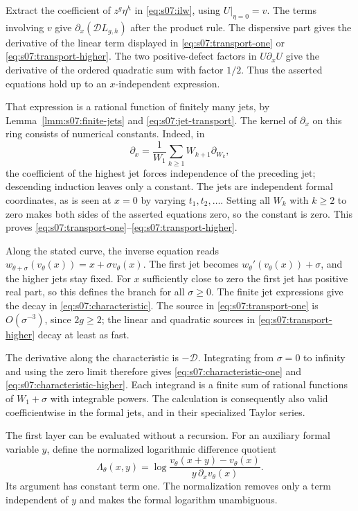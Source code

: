 \begin{prf}
Extract the coefficient of $z^g\eta^h$ in
\eqref{eq:s07:ilw}, using $U|_{\eta=0}=v$. The terms involving
$v$ give $\partial_x(\mathscr DL_{g,h})$ after the product rule.
The dispersive part gives the derivative of the linear term displayed
in \eqref{eq:s07:transport-one} or
\eqref{eq:s07:transport-higher}. The two positive-defect factors
in $U\partial_xU$ give the derivative of the ordered quadratic sum
with factor $1/2$. Thus the asserted equations hold up to an
$x$-independent expression.

That expression is a rational function of finitely many jets, by
Lemma~\ref{lmm:s07:finite-jets} and
\eqref{eq:s07:jet-transport}. The kernel of $\partial_x$ on this
ring consists of numerical constants. Indeed, in
\[
 \partial_x=\frac1{W_1}\sum_{k\geq1}W_{k+1}\partial_{W_k},
\]
the coefficient of the highest jet forces independence of the
preceding jet; descending induction leaves only a constant.
The jets are independent formal coordinates, as is seen at $x=0$
by varying $t_1,t_2,\ldots$. Setting all $W_k$ with $k\geq2$ to
zero makes both sides of the asserted equations zero, so the
constant is zero. This proves
\eqref{eq:s07:transport-one}--\eqref{eq:s07:transport-higher}.

Along the stated curve, the inverse equation reads
$w_{\theta+\sigma}(v_\theta(x))=x+\sigma v_\theta(x)$.
The first jet becomes $w_\theta'(v_\theta(x))+\sigma$, and the
higher jets stay fixed. For $x$ sufficiently close to zero the
first jet has positive real part, so this defines the branch for
all $\sigma\geq0$. The finite jet expressions give the decay in
\eqref{eq:s07:characteristic}. The source in
\eqref{eq:s07:transport-one} is $O(\sigma^{-3})$, since
$2g\geq2$; the linear and quadratic sources in
\eqref{eq:s07:transport-higher} decay at least as fast.

The derivative along the characteristic is $-\mathscr D$.
Integrating from $\sigma=0$ to infinity and using the zero limit
therefore gives \eqref{eq:s07:characteristic-one} and
\eqref{eq:s07:characteristic-higher}. Each integrand is a finite
sum of rational functions of $W_1+\sigma$ with integrable powers.
The calculation is consequently also valid coefficientwise in the
formal jets, and in their specialized Taylor series.
\end{prf}

The first layer can be evaluated without a recursion. For an
auxiliary formal variable $y$, define the normalized logarithmic
difference quotient
\begin{equation}\label{eq:s07:logarithmic-kernel}
 \Lambda_\theta(x,y)
 =\log\frac{v_\theta(x+y)-v_\theta(x)}
                  {y\,\partial_xv_\theta(x)}.
\end{equation}
Its argument has constant term one. The normalization removes only
a term independent of $y$ and makes the formal logarithm unambiguous.

